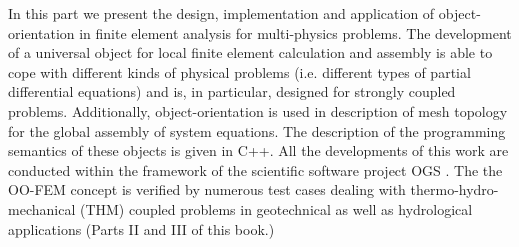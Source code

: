 In this part we present the design, implementation and application of 
object-orientation in finite element analysis for multi-physics 
problems. The development of a universal object for local 
finite element calculation and assembly is able to 
cope with different kinds of physical problems (i.e. different types 
of partial differential equations) and is, in particular, designed 
for strongly coupled problems. Additionally, object-orientation is used 
in description of mesh topology for the global assembly of system 
equations. The description of the programming semantics of these 
objects is given in C++. All the developments of this work are 
conducted within the framework of the scientific 
software project OGS \cite{geosys}. The the OO-FEM concept is verified by 
numerous test cases dealing with thermo-hydro-mechanical (THM) 
coupled problems in geotechnical as well as hydrological applications (Parts II and III of this book.)
